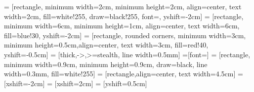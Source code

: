 \documentclass[]{article}
\begin{document}

 = [rectangle, minimum width=2cm, minimum height=2cm, align=center, text width=2cm, fill=white!255, draw=black!255, font=\normalsize, yshift=-2cm]
 = [rectangle, minimum width=6cm, minimum height=1cm, align=center, text width=6cm, fill=blue!30, yshift=-2cm]
 = [rectangle, rounded corners, minimum width=3cm, minimum height=0.5cm,align=center, text width=3cm, fill=red!40, yshift=-0.5cm]
 = [thick,->,>=stealth, line width=0.5mm]
=[font=\scriptsize]
 = [rectangle, minimum width=0.9cm, minimum height=0.9cm, draw=black, line width=0.3mm, fill=white!255]
 = [rectangle,align=center, text width=4.5cm]
 = [xshift=-2cm]
 = [xshift=2cm]
 = [yshift=0.5cm]
\end{document}
